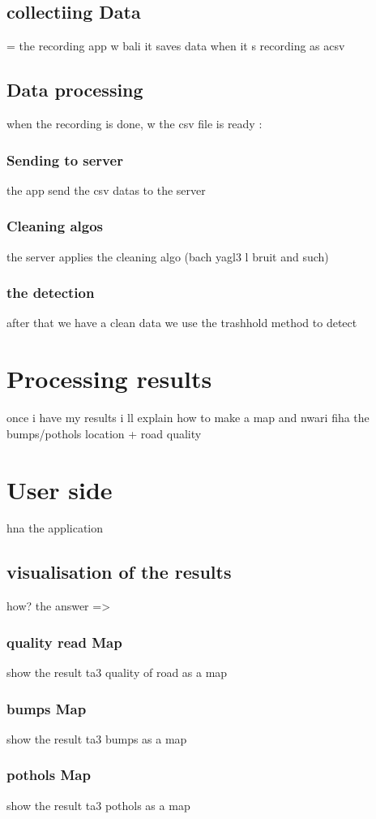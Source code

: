 \section{collectiing Data}
= the recording app w bali it saves data when it s recording as acsv
\section{Data processing}
when the recording is done, w the csv file is ready :
\subsection{Sending to server}
the app send the csv datas to the server
\subsection{Cleaning algos}
the server applies the cleaning algo (bach yagl3 l bruit and such)
\subsection{the detection}
after that we have a clean data we use the trashhold method to detect 
\chapter{Processing results}
once i have my results
 i ll explain how to make a map and nwari fiha the bumps/pothols location + road quality 

\chapter{User side}
hna the application
\section{visualisation of the results}
how? the answer =>
\subsection{quality read Map}
show the result ta3 quality of road as a map
\subsection{bumps Map}
show the result ta3 bumps as a map
\subsection{pothols Map}
show the result ta3 pothols as a map


\renewcommand {\thesection}{\thechapter.\arabic{section}}